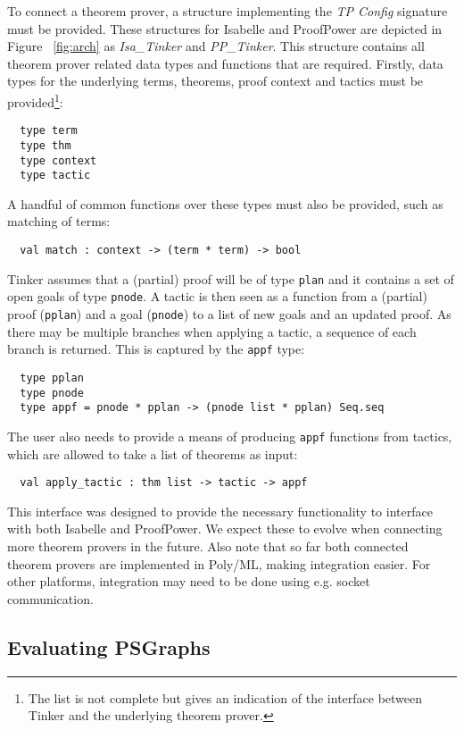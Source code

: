 \documentclass[submission,copyright,creativecommons]{eptcs}
\begin{document}
To connect a theorem prover, a structure implementing the \emph{TP Config} signature must be provided. These structures for Isabelle and ProofPower are depicted in Figure ~\ref{fig:arch} as \emph{Isa\_Tinker} and \emph{PP\_Tinker}. This structure contains all theorem prover related data types and functions that are required. Firstly, data types for the underlying terms, theorems, proof context and tactics must be provided\footnote{The list is not complete but gives an indication of the interface between Tinker and the underlying theorem prover.}:
\begin{verbatim}
  type term 
  type thm
  type context
  type tactic 
\end{verbatim}
A handful of common functions over these types must also be provided, such as matching of terms:
\begin{verbatim}
  val match : context -> (term * term) -> bool
\end{verbatim}
Tinker assumes that a (partial) proof will be of type \texttt{plan} and it contains a set of open goals of type \texttt{pnode}. A tactic
is then seen as a function from a (partial) proof (\texttt{pplan}) and a goal (\texttt{pnode}) to a list of new goals and 
an updated proof. As there may be multiple branches when applying a tactic, a sequence of each branch is returned. This is captured by 
the \texttt{appf} type:
\begin{verbatim}
  type pplan
  type pnode
  type appf = pnode * pplan -> (pnode list * pplan) Seq.seq
\end{verbatim}
The user also needs to provide a means of producing \texttt{appf} functions from tactics, which are allowed to take a list of theorems as input:
\begin{verbatim}
  val apply_tactic : thm list -> tactic -> appf
\end{verbatim}

This interface was designed to provide the necessary functionality to interface with both Isabelle and ProofPower. We expect these to evolve when connecting more theorem provers in the future. Also note that so far both connected theorem provers are implemented in Poly/ML, making integration easier. For other platforms, integration may need to be done using e.g. socket communication.

\vspace{-5pt}
\subsection{Evaluating PSGraphs}
\vspace{-5pt}
\end{document}
